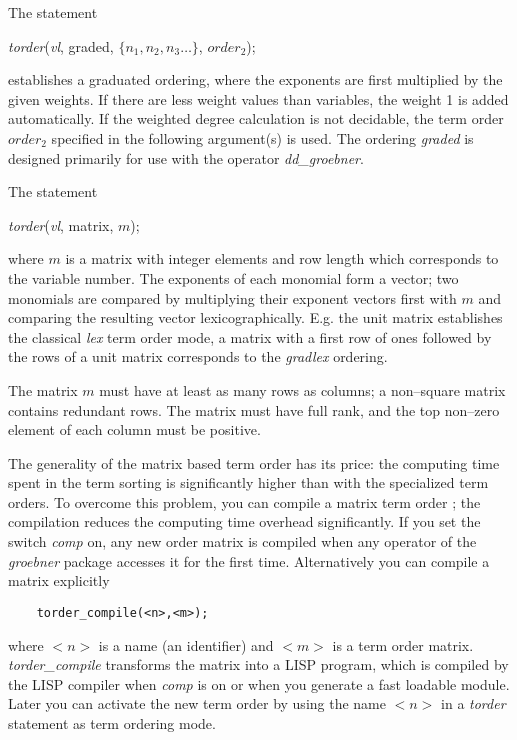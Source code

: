  
The statement
\begin{center}
{\it torder}(\emph{vl}, graded, $\{n_1,n_2,n_3 \ldots\}$, $order_2$);
\end{center}
establishes a graduated ordering, where the exponents are first
multiplied by the given weights. If there are less weight values than
variables, the weight 1 is added automatically. If the weighted
degree calculation is not decidable, the term order $order_2$ specified
in the following argument(s) is used.  The ordering \emph{graded} is designed
primarily for use with the operator \emph{dd\_groebner}.

 
The statement
\begin{center}
{\it torder}(\emph{vl}, matrix, $m$);
\end{center}
where $m$ is a matrix with integer elements and row length which
corresponds to the variable number. The exponents of each monomial
form a vector; two monomials are compared by multiplying their
exponent vectors first with $m$ and comparing the resulting vector
lexicographically. E.g. the unit matrix establishes the classical
\emph{lex} term order mode, a matrix with a first row of ones followed
by the rows of a unit matrix corresponds to the \emph{gradlex} ordering.

The matrix $m$ must have at least as many rows as columns; a non--square
matrix contains redundant rows. The matrix must have full rank, and
the top non--zero element of each column must be positive.

The generality of the matrix based term order has its price: the
computing time spent in the term sorting is significantly higher
than with the specialized term orders. To overcome this problem,
you can compile a matrix term order ; the
compilation reduces the computing time overhead significantly.
If you set the switch \emph{comp} on, any new order matrix is compiled
when any operator of the \emph{groebner} package accesses it for the
first time. Alternatively you can compile a matrix explicitly
\begin{verbatim}
    torder_compile(<n>,<m>);
\end{verbatim}
where $<n>$ is a name (an identifier) and $<m>$ is a term order matrix.
\emph{torder\_compile} transforms the matrix into a LISP program, which
is compiled by the LISP compiler when \emph{comp} is on or when you
generate a fast loadable module. Later you can activate the new term
order by using the name $<n>$ in a \emph{torder} statement as term ordering
mode.

